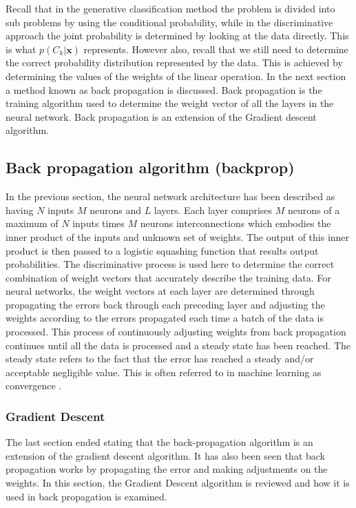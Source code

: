 Recall that in the generative classification method the problem is divided into sub problems by using the conditional probability, while in the discriminative approach the joint probability is determined by looking at the data directly.  This is what $p(C_k|\mathbf{x})$ represents.  However also, recall that we still need to determine the correct probability distribution represented by the data.  This is achieved by determining the values of the weights of the linear operation.  In the next section a method known as back propagation is discussed.  Back propagation is the training algorithm used to determine the weight vector of all the layers in the neural network.  Back propagation is an extension of the Gradient descent algorithm.

\subsection{Back propagation algorithm (backprop)}
In the previous section, the neural network architecture has been described as having $N$ inputs $M$ neurons and $L$ layers. Each layer comprises $M$ neurons of a maximum of $N$ inputs times $M$ neurons interconnections which embodies the inner product of the inputs and unknown set of weights. The output of this inner product is then passed to a logistic squashing function that results output probabilities.  The discriminative process is used here to determine the correct combination of weight vectors that accurately describe the training data.  For neural networks, the weight vectors at each layer are determined through propagating the errors back through each preceding layer and adjusting the weights according to the errors propagated each time a batch of the data is processed.  This process of continuously adjusting weights from back propagation continues until all the data is processed and a steady state has been reached.  The steady state refers to the fact that the error has reached a steady and/or acceptable negligible value.  This is often referred to in machine learning as convergence \citep{boden2002guide}.

\subsubsection{Gradient Descent}
The last section ended stating that the back-propagation algorithm is an extension of the gradient descent algorithm.  It has also been seen that back propagation works by propagating the error and making adjustments on the weights.  In this section, the Gradient Descent algorithm is reviewed and how it is used in back propagation is examined.  

